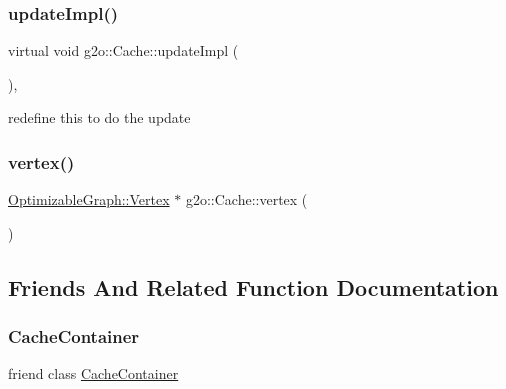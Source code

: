 \mbox{\label{classg2o_1_1_cache_ae46e4a4e37c034925edd6bbfdfaa1cb2}} 
\subsubsection{\texorpdfstring{update\+Impl()}{updateImpl()}}
{\footnotesize\ttfamily virtual void g2o\+::\+Cache\+::update\+Impl (\begin{DoxyParamCaption}{ }\end{DoxyParamCaption})\hspace{0.3cm}{\ttfamily [protected]}, {}}



redefine this to do the update 

\mbox{\label{classg2o_1_1_cache_ab94788e39d7e81201d14bc8ac58325c7}} 
\subsubsection{\texorpdfstring{vertex()}{vertex()}}
{\footnotesize\ttfamily \mbox{\hyperlink{classg2o_1_1_optimizable_graph_1_1_vertex}{Optimizable\+Graph\+::\+Vertex}} $\ast$ g2o\+::\+Cache\+::vertex (\begin{DoxyParamCaption}{ }\end{DoxyParamCaption})}



\subsection{Friends And Related Function Documentation}
\mbox{\label{classg2o_1_1_cache_a86dec1e0424aa4ae4e6867c69efd7868}} 
\subsubsection{\texorpdfstring{Cache\+Container}{CacheContainer}}
{\footnotesize\ttfamily friend class \mbox{\hyperlink{classg2o_1_1_cache_container}{Cache\+Container}}\hspace{0.3cm}{\ttfamily [friend]}}




